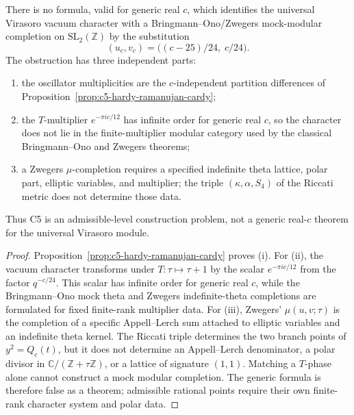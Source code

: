 \begin{theorem}
\label{thm:c5-zwegers-mu-shadow-explicit}
%
%
There is no formula, valid for generic real $c$, which identifies the
universal Virasoro vacuum character with a Bringmann--Ono/Zwegers
mock-modular completion on $\mathrm{SL}_2(\mathbb Z)$ by the
substitution
\[
(u_c,v_c)=\bigl((c-25)/24,\;c/24\bigr).
\]
The obstruction has three independent parts:
\begin{enumerate}[label=\textup{(\roman*)}]
\item the oscillator multiplicities are the $c$-independent
partition differences of Proposition~\ref{prop:c5-hardy-ramanujan-cardy};
\item the $T$-multiplier $e^{-\pi i c/12}$ has infinite order for
generic real $c$, so the character does not lie in the finite-multiplier
modular category used by the classical Bringmann--Ono and Zwegers
theorems;
\item a Zwegers $\mu$-completion requires a specified indefinite theta
lattice, polar part, elliptic variables, and multiplier; the triple
$(\kappa,\alpha,S_4)$ of the Riccati metric does not determine those
data.
\end{enumerate}
Thus C5 is an admissible-level construction problem, not a generic
real-$c$ theorem for the universal Virasoro module.
\end{theorem}

\begin{proof}
Proposition~\ref{prop:c5-hardy-ramanujan-cardy} proves (i). For
(ii), the vacuum character transforms under $T:\tau\mapsto\tau+1$
by the scalar $e^{-\pi i c/12}$ from the factor $q^{-c/24}$. This
scalar has infinite order for generic real $c$, while the
Bringmann--Ono mock theta and Zwegers indefinite-theta completions
are formulated for fixed finite-rank multiplier data. For (iii),
Zwegers' $\mu(u,v;\tau)$ is the completion of a specific Appell--Lerch
sum attached to elliptic variables and an indefinite theta kernel.
The Riccati triple determines the two branch points of
$y^2=Q_c(t)$, but it does not determine an Appell--Lerch denominator,
a polar divisor in $\mathbb C/(\mathbb Z+\tau\mathbb Z)$, or a
lattice of signature $(1,1)$. Matching a $T$-phase alone cannot
construct a mock modular completion. The generic formula is therefore
false as a theorem; admissible rational points require their own
finite-rank character system and polar data.
\end{proof}

